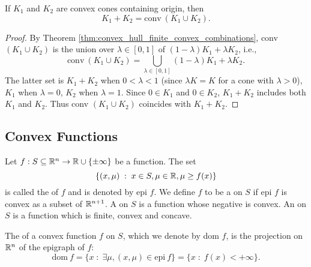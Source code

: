 \documentclass[11pt,a4paper]{article}
\begin{document}
\begin{theorem}
    If $K_1$ and $K_2$ are convex cones containing origin, then
    \begin{equation*}
        K_1+K_2 = \text{conv}\ (K_1\cup K_2).
    \end{equation*} 
\end{theorem}

\begin{proof}
    By Theorem \ref{thm:convex_hull_finite_convex_combinations}, conv $(K_1\cup K_2)$ is the union over $\lambda\in [0,1]$ of $(1-\lambda)K_1 + \lambda K_2$, i.e.,
    \begin{equation*}
        \text{conv}\ (K_1\cup K_2) = \bigcup_{\lambda\in [0,1]} (1-\lambda)K_1 + \lambda K_2.
    \end{equation*}
    The latter set is $K_1+K_2$ when $0<\lambda<1$ (since $\lambda K = K$ for a cone with $\lambda>0$), $K_1$ when $\lambda = 0$, $K_2$ when $\lambda = 1$. Since $0\in K_1$ and $0\in K_2$, $K_1+K_2$ includes both $K_1$ and $K_2$. Thus conv $(K_1\cup K_2)$ coincides with $K_1+K_2$.
\end{proof}

\subsection{Convex Functions}

\begin{definition}
    Let $f:S\subseteq \mathbb{R}^n\rightarrow \mathbb{R}\cup \{\pm \infty\}$ be a function. The set 
    \begin{equation*}
        \{(x,\mu)\;:\; x\in S,\mu\in \mathbb{R},\mu\ge f(x)\}
    \end{equation*}
    is called the  of $f$ and is denoted by epi $f$. We define $f$ to be a  on $S$ if epi $f$ is convex as a subset of $\mathbb{R}^{n+1}$. A  on $S$ is a function whose negative is convex. An  on $S$ is a function which is finite, convex and concave.
\end{definition}

\begin{definition}\label{def:effective_domain}
    The  of a convex function $f$ on $S$, which we denote by dom $f$, is the projection on $\mathbb{R}^n$ of the epigraph of $f$:
    \begin{equation*}
        \text{dom}\ f = \{x\;:\;\exists \mu,(x,\mu)\in\text{epi}\ f\} = \{x\;:\;f(x)<+\infty\}.
    \end{equation*}
\end{definition}
\end{document}
